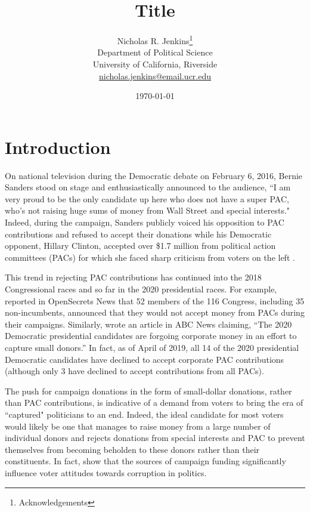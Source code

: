 \documentclass[12pt]{article}
\title{\textbf{Title}}
\author{Nicholas R. Jenkins\thanks{Acknowledgements} \\ Department of Political Science\\ University of California, Riverside\\ \href{mailto:nicholas.jenkins@email.ucr.edu}{nicholas.jenkins@email.ucr.edu}}
\date{\today}
\begin{document}
\maketitle
\thispagestyle{empty}

\pagebreak

\cleardoublepage
\setcounter{page}{1}

\doublespacing

\section{Introduction} \label{sec: intro}

On national television during the Democratic debate on February 6, 2016, Bernie Sanders stood on stage and enthusiastically announced to the audience, ``I am very proud to be the only candidate up here who does not have a super PAC, who’s not raising huge sums of money from Wall Street and special interests." Indeed, during the campaign, Sanders publicly voiced his opposition to PAC contributions and refused to accept their donations while his Democratic opponent, Hillary Clinton, accepted over \$1.7 million from political action committees (PACs) for which she faced sharp criticism from voters on the left \citep{harper_2020_2019, ye_hee_lee_sanderss_2016, seitz-wald_promise_2015, bump_why_2016}. 

This trend in rejecting PAC contributions has continued into the 2018 Congressional races and so far in the 2020 presidential races. For example, \citet{evers-hillstrom_democrats_2018} reported in OpenSecrets News that 52 members of the 116 Congress, including 35 non-incumbents, announced that they would not accept money from PACs during their campaigns. Similarly,  wrote an article in ABC News claiming, ``The 2020 Democratic presidential candidates are forgoing corporate money in an effort to capture small donors.'' In fact, as of April of 2019, all 14 of the 2020 presidential Democratic candidates have declined to accept corporate PAC contributions (although only 3 have declined to accept contributions from all PACs). 

The push for campaign donations in the form of small-dollar donations, rather than PAC contributions, is indicative of a demand from voters to bring the era of ``captured" politicians to an end. Indeed, the ideal candidate for most voters would likely be one that manages to raise money from a large number of individual donors and rejects donations from special interests and PAC to prevent themselves from becoming beholden to these donors rather than their constituents. In fact, \citet{bowler_campaign_2016} show that the sources of campaign funding significantly influence voter attitudes towards corruption in politics.  
\end{document}
